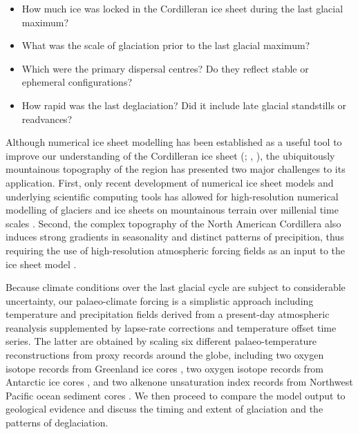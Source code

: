 \documentclass[tc, manuscript]{copernicus}
\begin{document}
\begin{itemize}
  \item How much ice was locked in the Cordilleran ice sheet during the
    last glacial maximum?
  \item What was the scale of glaciation prior to the last glacial maximum?
  \item Which were the primary dispersal centres? Do they reflect stable or
    ephemeral configurations?
  \item How rapid was the last deglaciation? Did it include late glacial
    standstills or readvances?
\end{itemize}

Although numerical ice sheet modelling has been established as a useful tool to
improve our understanding of the Cordilleran ice sheet
    (\citealp[p.~227]{Jackson.Clague.1991}; \citealp{Robert.1991},
     \citealp{Marshall.etal.2000}),
the ubiquitously mountainous
topography of the region has presented two major challenges to its application.
First, only recent development of numerical ice sheet models and underlying
scientific computing tools \citep{Bueler.Brown.2009, Balay.etal.2014} has
allowed for high-resolution numerical modelling of glaciers and ice sheets on
mountainous terrain
over millenial time scales \citep[e.g.,][]{Golledge.etal.2012}. Second, the
complex
topography of the North American Cordillera also induces strong gradients in
seasonality and distinct patterns of precipition, thus requiring the use of
high-resolution atmospheric forcing fields as an input to the ice sheet model
\citep{Seguinot.etal.2014}.

Because climate conditions over the last glacial cycle are subject to
considerable uncertainty, our palaeo-climate forcing is a simplistic approach
including temperature and precipitation fields derived from a
present-day atmospheric reanalysis \citep{Mesinger.etal.2006,
Seguinot.etal.2014} supplemented by lapse-rate corrections
and temperature offset time series. The latter are obtained by scaling six
different palaeo-temperature reconstructions from proxy records around the
globe, including two oxygen isotope records from Greenland ice cores
\citep{Dansgaard.etal.1993, Andersen.etal.2004}, two oxygen isotope
records from Antarctic ice cores \citep{Petit.etal.1999,Jouzel.etal.2007},
and two alkenone unsaturation index records from Northwest Pacific ocean
sediment cores \citep{Herbert.etal.2001}. We then proceed to compare the model
output to geological evidence and discuss the timing and extent of glaciation
and the patterns of deglaciation.
\end{document}
